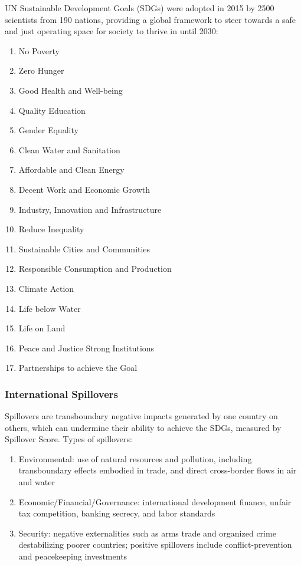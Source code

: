 \documentclass[12pt, a4paper]{article}
\begin{document}
\begin{multicols*}{3}
UN Sustainable Development Goals (SDGs) were adopted in 2015 by 2500 scientists from 190 nations, providing a global framework to steer towards a safe and just operating space for society to thrive in until 2030:
\begin{enumerate}[\arabic*.]
  \item No Poverty 
  \item Zero Hunger
  \item Good Health and Well-being 
  \item Quality Education 
  \item Gender Equality
  \item Clean Water and Sanitation
  \item Affordable and Clean Energy
  \item Decent Work and Economic Growth 
  \item Industry, Innovation and Infrastructure
  \item Reduce Inequality
  \item Sustainable Cities and Communities
  \item Responsible Consumption and Production 
  \item Climate Action 
  \item Life below Water 
  \item Life on Land 
  \item Peace and Justice Strong Institutions
  \item Partnerships to achieve the Goal
\end{enumerate}
\vspace{-1em}
\colbreak
\subsubsection{International Spillovers}
Spillovers are transboundary negative impacts generated by one country on others, which can undermine their ability to achieve the SDGs, measured by Spillover Score. Types of spillovers:
\begin{enumerate}[\roman*.]
  \item Environmental: use of natural resources and pollution, including transboundary effects embodied in trade, and direct cross-border flows in air and water
  \item Economic/Financial/Governance: international development finance, unfair tax competition, banking secrecy, and labor standards
  \item Security: negative externalities such as arms trade and organized crime destabilizing poorer countries; positive spillovers include conflict-prevention and peacekeeping investments
\end{enumerate}


\end{multicols*}
\end{document}
